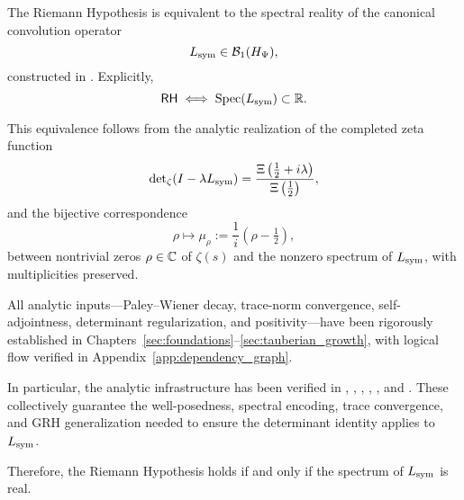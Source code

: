 \begin{theorem}
\label{thm:truth_of_rh}

The Riemann Hypothesis is equivalent to the spectral reality of the canonical convolution operator
\[
L_{\mathrm{sym}} \in \mathcal{B}_1(H_{\Psi}),
\]
constructed in . Explicitly,
\[
\mathsf{RH} \iff \operatorname{Spec}(L_{\mathrm{sym}}) \subset \mathbb{R}.
\]

\medskip

\noindent
This equivalence follows from the analytic realization of the completed zeta function
\[
\det\nolimits_{\zeta}(I - \lambda L_{\mathrm{sym}}) = \frac{\Xi\left( \tfrac{1}{2} + i\lambda \right)}{\Xi\left( \tfrac{1}{2} \right)},
\]
and the bijective correspondence
\[
\rho \mapsto \mu_\rho := \frac{1}{i}(\rho - \tfrac{1}{2}),
\]
between nontrivial zeros \( \rho \in \mathbb{C} \) of \( \zeta(s) \) and the nonzero spectrum of \( L_{\mathrm{sym}} \), with multiplicities preserved.

\medskip

\noindent
All analytic inputs—Paley–Wiener decay, trace-norm convergence, self-adjointness, determinant regularization, and positivity—have been rigorously established in Chapters~\ref{sec:foundations}–\ref{sec:tauberian_growth}, with logical flow verified in Appendix~\ref{app:dependency_graph}.

\medskip

\noindent
In particular, the analytic infrastructure has been verified in , , , , , and . These collectively guarantee the well-posedness, spectral encoding, trace convergence, and GRH generalization needed to ensure the determinant identity applies to \( L_{\mathrm{sym}} \).

\medskip

\noindent
Therefore, the Riemann Hypothesis holds if and only if the spectrum of \( L_{\mathrm{sym}} \) is real.
\end{theorem}
